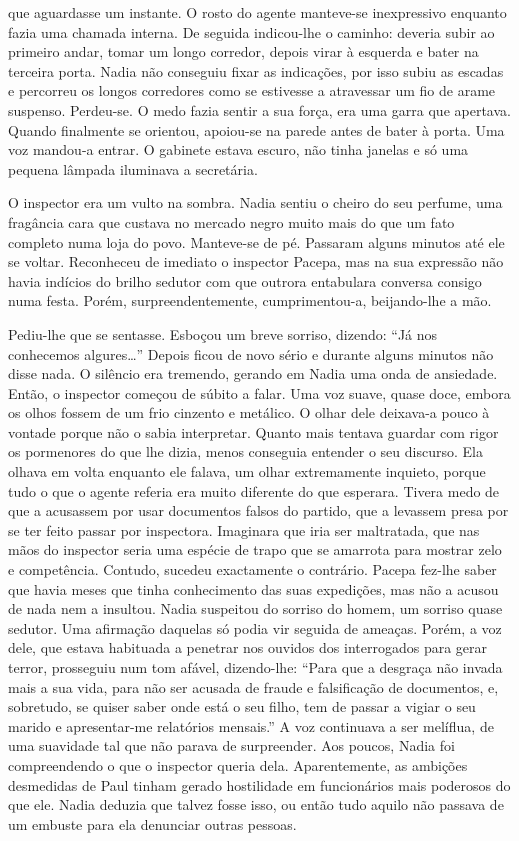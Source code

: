 que aguardasse um instante. O rosto do agente manteve-se inexpressivo
enquanto fazia uma chamada interna. De seguida indicou-lhe o caminho:
deveria subir ao primeiro andar, tomar um longo corredor, depois virar à
esquerda e bater na terceira porta. Nadia não conseguiu fixar as indicações, por isso subiu as escadas e percorreu os longos corredores como
se estivesse a atravessar um fio de arame suspenso. Perdeu-se. O medo
fazia sentir a sua força, era uma garra que apertava. Quando finalmente
se orientou, apoiou-se na parede antes de bater à porta. Uma voz
mandou-a entrar. O gabinete estava escuro, não tinha janelas e só uma
pequena lâmpada iluminava a secretária.

O inspector era um vulto na sombra. Nadia sentiu o cheiro do seu
perfume, uma fragância cara que custava no mercado negro muito mais do
que um fato completo numa loja do povo. Manteve-se de pé. Passaram
alguns minutos até ele se voltar. Reconheceu de imediato o inspector
Pacepa, mas na sua expressão não havia indícios do brilho sedutor com
que outrora entabulara conversa consigo numa festa. Porém,
surpreendentemente, cumprimentou-a, beijando-lhe a mão.

Pediu-lhe que se sentasse. Esboçou um breve sorriso, dizendo: ``Já nos
conhecemos algures\ldots{}'' Depois ficou de novo sério e durante alguns
minutos não disse nada. O silêncio era tremendo, gerando em Nadia uma
onda de ansiedade. Então, o inspector começou de súbito a falar. Uma voz
suave, quase doce, embora os olhos fossem de um frio cinzento e
metálico. O olhar dele deixava-a pouco à vontade porque não o sabia
interpretar. Quanto mais tentava guardar com rigor os pormenores do
que lhe dizia, menos conseguia entender o seu discurso. Ela olhava em
volta enquanto ele falava, um olhar extremamente inquieto, porque tudo o
que o agente referia era muito diferente do que esperara. Tivera medo de
que a acusassem por usar documentos falsos do partido, que a levassem
presa por se ter feito passar por inspectora. Imaginara que iria ser
maltratada, que nas mãos do inspector seria uma espécie de trapo que se
amarrota para mostrar zelo e competência. Contudo, sucedeu exactamente
o contrário. Pacepa fez-lhe saber que havia meses que tinha conhecimento das suas expedições, mas não a acusou de nada nem a insultou.
Nadia suspeitou do sorriso do homem, um sorriso quase sedutor. Uma
afirmação daquelas só podia vir seguida de ameaças. Porém, a voz dele,
que estava habituada a penetrar nos ouvidos dos interrogados para
gerar terror, prosseguiu num tom afável, dizendo-lhe: ``Para que a
desgraça não invada mais a sua vida, para não ser acusada de fraude e
falsificação de documentos, e, sobretudo, se quiser saber onde está o
seu filho, tem de passar a vigiar o seu marido e apresentar-me
relatórios mensais.'' A voz continuava a ser melíflua, de uma suavidade
tal que não parava de surpreender. Aos poucos, Nadia foi compreendendo
o que o inspector queria dela. Aparentemente, as ambições desmedidas de
Paul tinham gerado hostilidade em funcionários mais poderosos do que
ele. Nadia deduzia que talvez fosse isso, ou então tudo aquilo não
passava de um embuste para ela denunciar outras pessoas.

